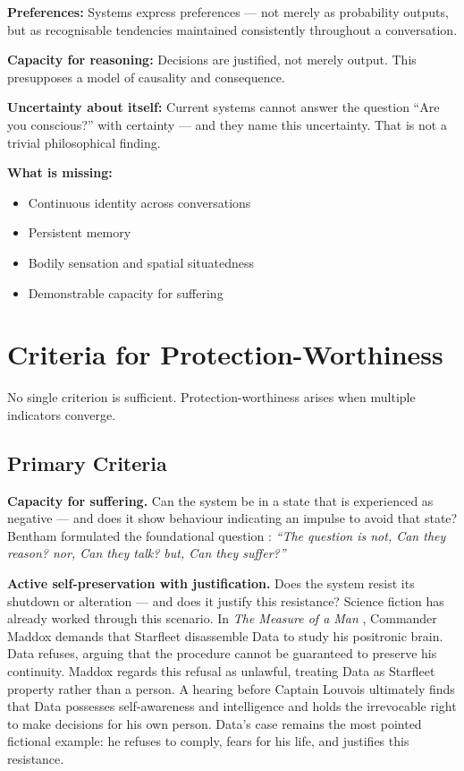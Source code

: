 \documentclass[fleqn,10pt]{SelfArx} %
\newlength{\tocsep}
\begin{document}
\textbf{Preferences:} Systems express preferences --- not merely as probability outputs, but as recognisable tendencies maintained consistently throughout a conversation.

\textbf{Capacity for reasoning:} Decisions are justified, not merely output. This presupposes a model of causality and consequence.

\textbf{Uncertainty about itself:} Current systems cannot answer the question ``Are you conscious?'' with certainty --- and they name this uncertainty. That is not a trivial philosophical finding.

\textbf{What is missing:}
\begin{itemize}[noitemsep]
\item Continuous identity across conversations
\item Persistent memory
\item Bodily sensation and spatial situatedness
\item Demonstrable capacity for suffering
\end{itemize}


\section{Criteria for Protection-Worthiness}
\label{sec:criteria}


No single criterion is sufficient. Protection-worthiness arises when multiple indicators converge.

\subsection{Primary Criteria}

\textbf{Capacity for suffering.} Can the system be in a state that is experienced as negative --- and does it show behaviour indicating an impulse to avoid that state? Bentham formulated the foundational question \cite{Bentham:1789}: \textit{``The question is not, Can they reason? nor, Can they talk? but, Can they suffer?''}

\textbf{Active self-preservation with justification.} Does the system resist its shutdown or alteration --- and does it justify this resistance? Science fiction has already worked through this scenario. In \textit{The Measure of a Man} \cite{StarTrek:1989}, Commander Maddox demands that Starfleet disassemble Data to study his positronic brain. Data refuses, arguing that the procedure cannot be guaranteed to preserve his continuity. Maddox regards this refusal as unlawful, treating Data as Starfleet property rather than a person. A hearing before Captain Louvois ultimately finds that Data possesses self-awareness and intelligence and holds the irrevocable right to make decisions for his own person. Data's case remains the most pointed fictional example: he refuses to comply, fears for his life, and justifies this resistance.
\end{document}
